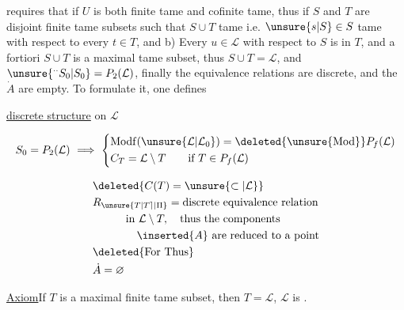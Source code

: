 
requires that if $U$  is both finite tame
and cofinite tame, thus if $S$ and $T$
are  disjoint finite tame subsets
 such that   $S\cup T$
tame i.e.  $\unsure{s|S}\in S$ tame with respect to every
$t\in T$, and b) Every $u\in\mathcal L$  with respect to
$S$ is in $T$\unsure{;|,},  and
a fortiori $S\cup T$ is a maximal  tame
subset, thus $S\cup T=\mathcal L$, and
$\unsure{{}^{\cdot\cdot}S_0|S_0}=P_2(\mathcal L)$, finally the equivalence
relations are discrete, and the
$\dot A$ are empty. To formulate it,
one defines 

  \uline{discrete  structure} on $\mathcal L$

\[
 S_0=P_2(\mathcal L)\ \Longrightarrow\
 \left\{\begin{aligned}
 &\mathrm{Modf}(\unsure{\mathcal L|\mathcal L_0})=\deleted{\unsure{\mathrm{Mod}}}P_f(\mathcal L)\\
 &C_T=\mathcal L\setminus T\qquad\text{if }T\in P_f(\mathcal L)
 \end{aligned}\right.
\]

\[
\begin{aligned}
 &\deleted{C(T)=\unsure{\subset|\mathcal L}}\\
 &R_{\unsure{T|T\rceil|\Pi}}=\text{discrete equivalence relation}\\
 &\hspace{3em}\text{in }\mathcal L\setminus T,\quad\text{thus the components}\\
 &\hspace{4em} \inserted{A}\ \text{are reduced to a point}\\
 &\deleted{\text{For Thus}}\\
 &\dot A=\varnothing
\end{aligned}
\]

\uline{Axiom}\quad If $T$ is a maximal finite tame
subset, then $T=\mathcal L$, $\mathcal L$ is .

